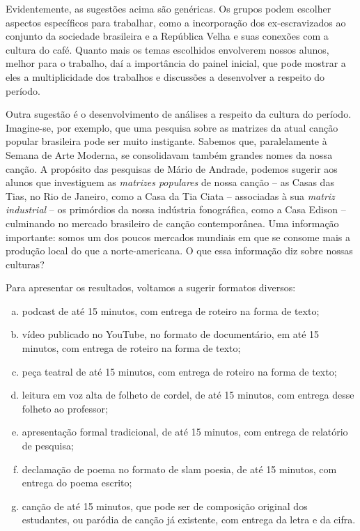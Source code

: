 \documentclass[11pt]{extarticle}
\begin{document}
Evidentemente, as sugestões acima são genéricas. Os grupos podem
escolher aspectos específicos para trabalhar, como a incorporação dos
ex-escravizados ao conjunto da sociedade brasileira e a República Velha
e suas conexões com a cultura do café. Quanto mais os temas escolhidos
envolverem nossos alunos, melhor para o trabalho, daí a importância do
painel inicial, que pode mostrar a eles a multiplicidade dos trabalhos e
discussões a desenvolver a respeito do período.

Outra sugestão é o desenvolvimento de análises a respeito da cultura do
período. Imagine-se, por exemplo, que uma pesquisa sobre as matrizes da
atual canção popular brasileira pode ser muito instigante. Sabemos que,
paralelamente à Semana de Arte Moderna, se consolidavam também grandes
nomes da nossa canção. A propósito das pesquisas de Mário de Andrade,
podemos sugerir aos alunos que investiguem as \emph{matrizes populares}
de nossa canção -- as Casas das Tias, no Rio de Janeiro, como a Casa da
Tia Ciata -- associadas à sua \emph{matriz industrial} -- os primórdios
da nossa indústria fonográfica, como a Casa Edison -- culminando no
mercado brasileiro de canção contemporânea. Uma informação importante:
somos um dos poucos mercados mundiais em que se consome mais a produção
local do que a norte-americana. O que essa informação diz sobre nossas
culturas?

Para apresentar os resultados, voltamos a sugerir formatos diversos:

\begin{enumerate}[(a)]  

\item podcast de até 15 minutos, com entrega de roteiro na forma de texto;

\item vídeo publicado no YouTube, no formato de documentário, em até 15
minutos, com entrega de roteiro na forma de texto;

\item peça teatral de até 15 minutos, com entrega de roteiro na forma de
texto;

\item leitura em voz alta de folheto de cordel, de até 15 minutos, com
entrega desse folheto ao professor;

\item apresentação formal tradicional, de até 15 minutos, com entrega de
relatório de pesquisa;

\item declamação de poema no formato de slam poesia, de até 15 minutos, com
entrega do poema escrito;

\item canção de até 15 minutos, que pode ser de composição original dos
estudantes, ou paródia de canção já existente, com entrega da letra e da
cifra.

\end{enumerate} 
\end{document}
